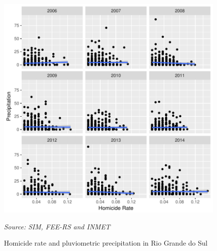\documentclass[12pt,openright,oneside,a4paper,english,french,spanish]{abntex2}
\numberwithin{table}{section} %
\numberwithin{figure}{section} %
\newcommand{\source}[1]{\textit{#1}}
\begin{document}
\begin{otherlanguage}{english}
\begin{subappendices}
\begin{figure}[H]
\begin{center}
\includegraphics{TESE_DE_DOUTORADO_RENAN_FINAL-plot_prec_HV}
\end{center}
\caption{Homicide rate and pluviometric precipitation in Rio Grande do Sul}
\source{Source: SIM, FEE-RS and INMET}
\label{fig:prec_homicidios}
\end{figure}


\end{subappendices}
\end{otherlanguage}
\end{document}
